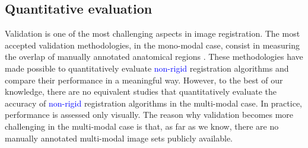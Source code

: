 \subsection{Quantitative evaluation}
Validation is one of the most challenging aspects in image registration. The most accepted validation methodologies, in the mono-modal case, consist in measuring the overlap of manually annotated anatomical regions \cite{Klein2009, Klein2010, Rohlfing2012}. These methodologies have made possible to quantitatively evaluate \textcolor{blue}{non-rigid} registration algorithms and compare their performance in a meaningful way. However, to the best of our knowledge, there are no equivalent studies that quantitatively evaluate the accuracy of \textcolor{blue}{non-rigid} registration algorithms in the multi-modal case. In practice, performance is assessed only visually. The reason why validation becomes more challenging in the multi-modal case is that, as far as we know, there are no manually annotated multi-modal image sets publicly available.

\vspace{-0.2cm}
